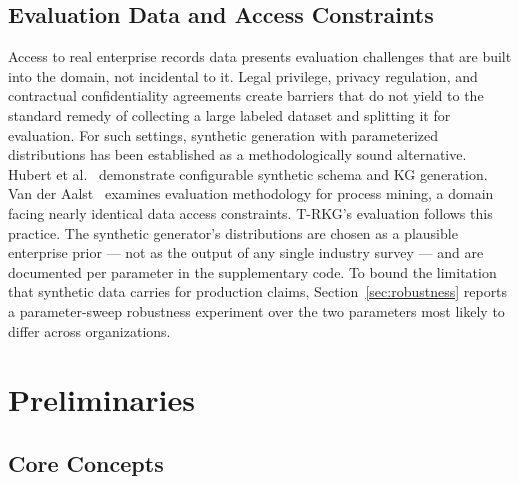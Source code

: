 \documentclass{ieeeaccess}
\begin{document}
\subsection{Evaluation Data and Access Constraints}

Access to real enterprise records data presents evaluation challenges that are built into the domain, not incidental to it. Legal privilege, privacy regulation, and contractual confidentiality agreements create barriers that do not yield to the standard remedy of collecting a large labeled dataset and splitting it for evaluation. For such settings, synthetic generation with parameterized distributions has been established as a methodologically sound alternative. Hubert et al.~\cite{pygraft} demonstrate configurable synthetic schema and KG generation. Van der Aalst~\cite{vanderaalst2016} examines evaluation methodology for process mining, a domain facing nearly identical data access constraints. T-RKG's evaluation follows this practice. The synthetic generator's distributions are chosen as a plausible enterprise prior — not as the output of any single industry survey — and are documented per parameter in the supplementary code. To bound the limitation that synthetic data carries for production claims, Section~\ref{sec:robustness} reports a parameter-sweep robustness experiment over the two parameters most likely to differ across organizations.

\section{Preliminaries}

\subsection{Core Concepts}
\end{document}
